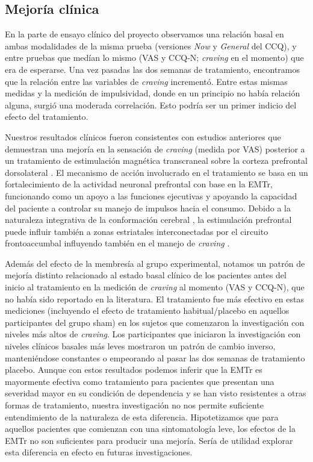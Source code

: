 \subsection{Mejoría clínica}
En la parte de ensayo clínico del proyecto observamos una relación basal en ambas modalidades de la misma prueba (versiones \textit{Now} y \textit{General} del CCQ), y entre pruebas que medían lo mismo (VAS y CCQ-N; \textit{craving} en el momento) que era de esperarse. Una vez pasadas las dos semanas de tratamiento, encontramos que la relación entre las variables de \textit{craving} incrementó. Entre estas mismas medidas y la medición de impulsividad, donde en un principio no había relación alguna, surgió una moderada correlación. Esto podría ser un primer indicio del efecto del tratamiento.\par
Nuestros resultados clínicos fueron consistentes con estudios anteriores que demuestran una mejoría en la sensación de \textit{craving} (medida por VAS) posterior a un tratamiento de estimulación magnética transcraneal sobre la corteza prefrontal dorsolateral \parencite{Politi2008, Terraneo2016}. El mecanismo de acción involucrado en el tratamiento se basa en un fortalecimiento de la actividad neuronal prefrontal con base en la EMTr, funcionando como un apoyo a las funciones ejecutivas y apoyando la capacidad del paciente a controlar su manejo de impulsos hacia el consumo. Debido a la naturaleza integrativa de la conformación cerebral \parencite{Tononi1994}, la estimulación prefrontal puede influir también a zonas estriatales interconectadas por el circuito frontoaccumbal influyendo también en el manejo de \textit{craving} \parencite{Volkow2010a}. \par
Además del efecto de la membresía al grupo experimental, notamos un patrón de mejoría distinto relacionado al estado basal clínico de los pacientes antes del inicio al tratamiento en la medición de \textit{craving} al momento (VAS y CCQ-N), que no había sido reportado en la literatura.
El tratamiento fue más efectivo en estas mediciones (incluyendo el efecto de tratamiento habitual/placebo en aquellos participantes del grupo sham) en los sujetos que comenzaron la investigación con niveles más altos de \textit{craving}. Los participantes que iniciaron la investigación con niveles clínicos basales más leves mostraron un patrón de cambio inverso, manteniéndose constantes o empeorando al pasar las dos semanas de tratamiento placebo.
Aunque con estos resultados podemos inferir que la EMTr es mayormente efectiva como tratamiento para pacientes que presentan una severidad mayor en su condición de dependencia y se han visto resistentes a otras formas de tratamiento, nuestra investigación no nos permite suficiente entendimiento de la naturaleza de esta diferencia. Hipotetizamos que para aquellos pacientes que comienzan con una sintomatología leve, los efectos de la EMTr no son suficientes para producir una mejoría. Sería de utilidad explorar esta diferencia en efecto en futuras investigaciones.\par
